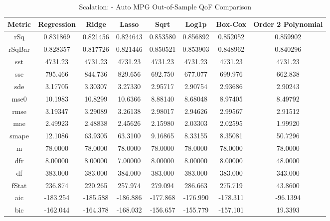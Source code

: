 \documentclass{article}
\begin{document}
\begin{table}[H]
\centering
\caption{Scalation: - Auto MPG Out-of-Sample QoF Comparison}
\label{tab:Scalation: - Auto MPG Out-of-Sample QoF Comparison}
\begin{tabular}{|c|c|c|c|c|c|c|c|} \hline 
Metric & Regression & Ridge & Lasso & Sqrt & Log1p & Box-Cox & Order 2 Polynomial \\ \hline \hline 
rSq &0.831869 & 0.821456 &      0.824643 &      0.853580 &      0.856892 &      0.852052 &      0.859902 \\ \hline 
rSqBar &0.828357 &      0.817726 &      0.821446 &      0.850521 &      0.853903 &      0.848962 &      0.840296 \\ \hline 
sst &4731.23 &  4731.23 &       4731.23 &       4731.23 &       4731.23 &       4731.23 &       4731.23 \\ \hline 
sse &795.466 &  844.736 &       829.656 &       692.750 &       677.077 &       699.976 &       662.838 \\ \hline 
sde &3.17705 &  3.30307 &       3.27330 &       2.95717 &       2.90754 &       2.93686 &       2.90243 \\ \hline 
mse0 &10.1983 & 10.8299 &       10.6366 &       8.88140 &       8.68048 &       8.97405 &       8.49792 \\ \hline 
rmse &3.19347 & 3.29089 &       3.26138 &       2.98017 &       2.94626 &       2.99567 &       2.91512 \\ \hline 
mae &2.49923 &  2.48838 &       2.45626 &       2.15980 &       2.03303 &       2.02595 &       1.99920 \\ \hline 
smape &12.1086 &        63.9305 &       63.3100 &       9.16865 &       8.33155 &       8.35081 &       50.7296 \\ \hline 
m &78.0000 &    78.0000 &       78.0000 &       78.0000 &       78.0000 &       78.0000 &       78.0000 \\ \hline 
dfr &8.00000 &  8.00000 &       7.00000 &       8.00000 &       8.00000 &       8.00000 &       48.0000 \\ \hline 
df &383.000 &   383.000 &       384.000 &       383.000 &       383.000 &       383.000 &       343.000 \\ \hline 
fStat &236.874 &        220.265 &       257.974 &       279.094 &       286.663 &       275.719 &       43.8600 \\ \hline 
aic &-183.254 & -185.588 &      -186.886 &      -177.868 &      -176.990 &      -178.311 &      -96.1394 \\ \hline 
bic &-162.044 & -164.378 &      -168.032 &      -156.657 &      -155.779 &      -157.101 &      19.3393 \\ \hline 
\end{tabular}
\end{table}
\end{document}
